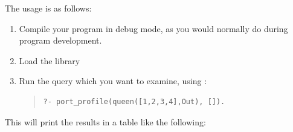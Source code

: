 The usage is as follows:
\begin{enumerate}
\item Compile your program in debug mode, as you would normally do during
program development.
\item Load the  library
\item Run the query which you want to examine, using
:
\begin{quote}
\begin{verbatim}
?- port_profile(queen([1,2,3,4],Out), []).
\end{verbatim}
\end{quote}
\end{enumerate}
This will print the results in a table like the following:

\vfill %

